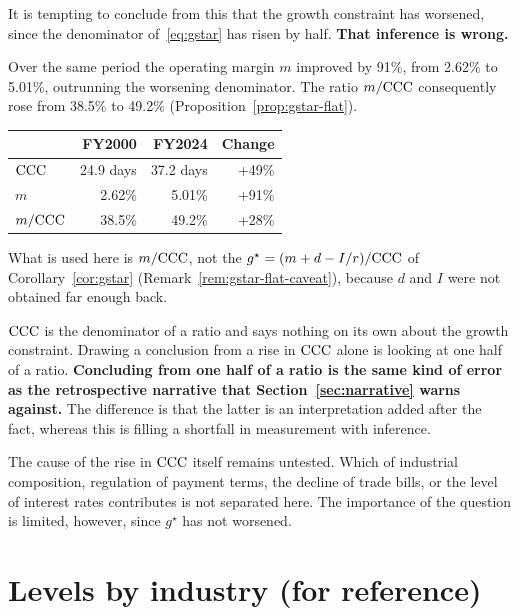 It is tempting to conclude from this that the growth constraint has worsened, since the
denominator of~\eqref{eq:gstar} has risen by half. \textbf{That inference is wrong.}

Over the same period the operating margin $m$ improved by 91\%, from 2.62\% to 5.01\%,
outrunning the worsening denominator. The ratio $m/\mathrm{CCC}$ consequently rose from 38.5\% to
49.2\% (Proposition~\ref{prop:gstar-flat}).

\begin{center}
\begin{tabular}{@{}lrrr@{}}
\toprule
 & FY2000 & FY2024 & Change \\
\midrule
$\mathrm{CCC}$ & 24.9 days & 37.2 days & +49\% \\
$m$ & 2.62\% & 5.01\% & +91\% \\
$m/\mathrm{CCC}$ & 38.5\% & 49.2\% & +28\% \\
\bottomrule
\end{tabular}
\label{tab:ccc-m-ratio-2000-2024}
\end{center}

What is used here is $m/\mathrm{CCC}$, not the $g^\star=(m+d-I/r)/\mathrm{CCC}$ of
Corollary~\ref{cor:gstar} (Remark~\ref{rem:gstar-flat-caveat}), because $d$ and $I$ were not
obtained far enough back.

\begin{remark}
$\mathrm{CCC}$ is the denominator of a ratio and says nothing on its own about the growth constraint.
Drawing a conclusion from a rise in $\mathrm{CCC}$ alone is looking at one half of a ratio.
\textbf{Concluding from one half of a ratio is the same kind of error as the retrospective
narrative that Section~\ref{sec:narrative} warns against.}
The difference is that the latter is an interpretation added after the fact, whereas this is
filling a shortfall in measurement with inference.
\end{remark}

The cause of the rise in $\mathrm{CCC}$ itself remains untested. Which of industrial composition,
regulation of payment terms, the decline of trade bills, or the level of interest rates
contributes is not separated here. The importance of the question is limited, however, since
$g^\star$ has not worsened.

\section{Levels by industry (for reference)}
\label{sec:ccc-extremes-by-industry}

